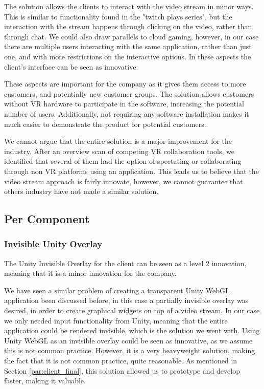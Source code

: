 The solution allows the clients to interact with the video stream in minor ways. This is similar to functionality found in the "twitch plays series"\cite{twitch_plays}, but the interaction with the stream happens through clicking on the video, rather than through chat. We could also draw parallels to cloud gaming, however, in our case there are multiple users interacting with the same application, rather than just one, and with more restrictions on the interactive options. In these aspects the client's interface can be seen as innovative.

These aspects are important for the company as it gives them access to more customers, and potentially new customer groups. The solution allows customers without VR hardware to participate in the software, increasing the potential number of users. Additionally, not requiring any software installation makes it much easier to demonstrate the product for potential customers.

We cannot argue that the entire solution is a major improvement for the industry. After an overview scan of competing VR collaboration tools, we identified that several of them had the option of spectating or collaborating through non VR platforms using an application. This leads us to believe that the video stream approach is fairly innovate, however, we cannot guarantee that others industry have not made a similar solution.

\subsection{Per Component}
\subsubsection{Invisible Unity Overlay}
The Unity Invisible Overlay for the client can be seen as a level 2 innovation, meaning that it is a minor innovation for the company\cite{nrcs}. 

We have seen a similar problem of creating a transparent Unity WebGL application been discussed before\cite{unity_transparent_webgl}, in this case a partially invisible overlay was desired, in order to create graphical widgets on top of a video stream\cite{unity_forum_partially_invisible}. In our case we only needed input functionality from Unity, meaning that the entire application could be rendered invisible, which is the solution we went with. Using Unity WebGL as an invisible overlay could be seen as innovative, as we assume this is not common practice. However, it is a very heavyweight solution, making the fact that it is not common practice, quite reasonable. As mentioned in Section \ref{par:client_final}, this solution allowed us to prototype and develop faster, making it valuable.

